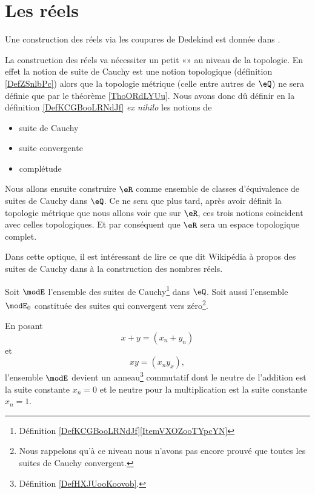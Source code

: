 \section{Les réels}

Une construction des réels via les coupures de Dedekind est donnée dans \cite{PaulinTopGmVegN}.

\begin{normaltext}
    La construction des réels va nécessiter un petit «» au niveau de la topologie. En effet la notion de suite de Cauchy est une notion topologique (définition \ref{DefZSnlbPc}) alors que la topologie métrique (celle entre autres de \( \eQ\)) ne sera définie que par le théorème \ref{ThoORdLYUu}. Nous avons donc dû définir en la définition \ref{DefKCGBooLRNdJf} \emph{ex nihilo} les notions de
\begin{itemize}
    \item
        suite de Cauchy 
    \item
        suite convergente
    \item
        complétude
\end{itemize}
Nous allons ensuite construire \( \eR\) comme ensemble de classes d'équivalence de suites de Cauchy dans \( \eQ\). Ce ne sera que plus tard, après avoir définit la topologie métrique que nous allons voir que sur \( \eR\), ces trois notions coïncident avec celles topologiques. Et par conséquent que \( \eR\) sera un espace topologique complet.

Dans cette optique, il est intéressant de lire ce que dit Wikipédia à propos des suites de Cauchy dans  à la construction des nombres réels.
\end{normaltext}

Soit \( \modE\) l'ensemble des suites de Cauchy\footnote{Définition \ref{DefKCGBooLRNdJf}\ref{ItemVXOZooTYpcYN}} dans \( \eQ\). Soit aussi l'ensemble \( \modE_0\) constituée des suites qui convergent vers zéro\footnote{Nous rappelons qu'à ce niveau nous n'avons pas encore prouvé que toutes les suites de Cauchy convergent.}.

En posant 
\begin{equation}
    x+y=(x_n+y_n)
\end{equation}
et
\begin{equation}
    xy=(x_ny_x),
\end{equation}
l'ensemble \( \modE\) devient un anneau\footnote{Définition \ref{DefHXJUooKoovob}.} commutatif dont le neutre de l'addition est la suite constante \( x_n=0\) et le neutre pour la multiplication est la suite constante \( x_n=1\).

